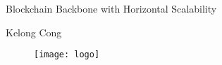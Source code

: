 \begin{titlepage}

\null\vfill

\begin{center}
\LARGE{Blockchain Backbone with Horizontal Scalability}
\end{center}

\vspace{1.5cm}

\begin{center}
Kelong Cong
\end{center}

\vfill

\begin{figure}[!b]
\centering
\texttt{[image: logo]}
\end{figure}

\vspace{2.0cm}

\end{titlepage}

